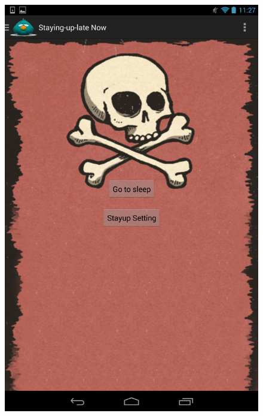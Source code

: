 \documentclass[14pt]{extreport}
\begin{document}
\begin{figure}[h]
\begin{center}
\includegraphics[width=5in]{stauplate}
\end{center}
\end{figure}
\end{document}
